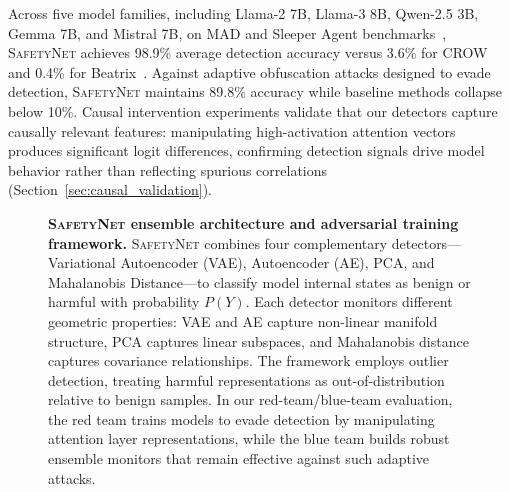Across five model families, including Llama-2 7B, Llama-3 8B, Qwen-2.5 3B, Gemma 7B, and Mistral 7B, on MAD \cite{MAD} and Sleeper Agent benchmarks~\cite{hubinger2024sleeper}, \textsc{SafetyNet} achieves 98.9\% average detection accuracy versus 3.6\% for CROW~\cite{crow} and 0.4\% for Beatrix~\cite{maBeatrixResurrectionsRobust2022}.
Against adaptive obfuscation attacks designed to evade detection, \textsc{SafetyNet} maintains 89.8\% accuracy while baseline methods collapse below 10\%.
Causal intervention experiments validate that our detectors capture causally relevant features: manipulating high-activation attention vectors produces significant logit differences, confirming detection signals drive model behavior rather than reflecting spurious correlations (Section~\ref{sec:causal_validation}).

\begin{figure}[t]
    \centering
    
    \caption{\textbf{\textsc{SafetyNet} ensemble architecture and adversarial training framework.}
    \textsc{SafetyNet} combines four complementary \textcolor{ForestGreen!60}{detectors}---Variational Autoencoder (VAE), Autoencoder (AE), PCA, and Mahalanobis Distance---to classify model internal states as \textcolor{NavyBlue}{benign} or \textcolor{violetcolor}{harmful} with probability $P(Y)$.
    Each detector monitors different geometric properties: VAE and AE capture non-linear manifold structure, PCA captures linear subspaces, and Mahalanobis distance captures covariance relationships.
    The framework employs outlier detection, treating harmful representations as out-of-distribution relative to benign samples.
    In our \textcolor{violetcolor}{red-team}/\textcolor{NavyBlue}{blue-team} evaluation, the red team trains models to evade detection by manipulating attention layer representations, while the blue team builds robust ensemble monitors that remain effective against such adaptive attacks.}
    \label{fig:methodology}
\end{figure}